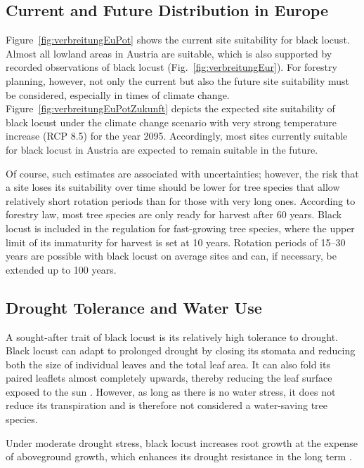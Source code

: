 
\subsection{Current and Future Distribution in Europe}

Figure~\ref{fig:verbreitungEuPot} shows the current site suitability for black locust. Almost all lowland areas in Austria are suitable, which is also supported by recorded observations of black locust (Fig.~\ref{fig:verbreitungEur}). For forestry planning, however, not only the current but also the future site suitability must be considered, especially in times of climate change. Figure~\ref{fig:verbreitungEuPotZukunft} depicts the expected site suitability of black locust under the climate change scenario with very strong temperature increase (RCP 8.5) for the year 2095. Accordingly, most sites currently suitable for black locust in Austria are expected to remain suitable in the future.


Of course, such estimates are associated with uncertainties; however, the risk that a site loses its suitability over time should be lower for tree species that allow relatively short rotation periods than for those with very long ones. According to forestry law, most tree species are only ready for harvest after 60 years. Black locust is included in the regulation for fast-growing tree species, where the upper limit of its immaturity for harvest is set at 10 years. Rotation periods of 15–30 years are possible with black locust on average sites and can, if necessary, be extended up to 100 years.


\subsection{Drought Tolerance and Water Use} %

A sought-after trait of black locust is its relatively high tolerance to drought. Black locust can adapt to prolonged drought by closing its stomata and reducing both the size of individual leaves and the total leaf area. It can also fold its paired leaflets almost completely upwards, thereby reducing the leaf surface exposed to the sun \citep{schildknecht1984blattbewegung}. However, as long as there is no water stress, it does not reduce its transpiration and is therefore not considered a water-saving tree species.

Under moderate drought stress, black locust increases root growth at the expense of aboveground growth, which enhances its drought resistance in the long term \citep{yang2018robinie}.

